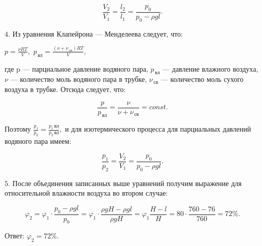 \documentclass[12pt,a4paper]{article}
\begin{document}
{\[\frac{V_2}{V_1} = \frac{l_2}{l_1} = \frac{p_0}{p_0 - \rho g l} .\]

$4$.  Из уравнения Клапейрона  — Менделеева следует, что: 

$p= \frac{\nu R T}{V} ,$ $p_{\,\text{вл}}= \frac{( \nu + \nu_{\,\text{св}} ) R T}{V} ,$

 где p  — парциальное давление водяного пара, $p_{\,\text{вл}}$  — давление влажного воздуха, $\nu$ — количество моль водяного пара в трубке, $\nu_{\,\text{св}}$  — количество моль сухого воздуха в трубке. Отсюда следует, что:

\[\frac{p}{p_{\,\text{вл}}} = \frac{\nu}{\nu + \nu_{\,\text{св}}} = const.\]

Поэтому $\frac{p_1}{p_2} = \frac{p_1 \,\text{вл}}{p_2 \,\text{вл}} ,$ и для изотермического процесса для парциальных давлений водяного пара имеем: 

\[\frac{p_1}{p_2} = \frac{V_2}{V_1} = \frac{p_0}{p_0 - \rho g l} .\]

$5$.  После объединения записанных выше уравнений получим выражение для относительной влажности воздуха во втором случае: 

\[\varphi_2=\varphi_1 \cdot \frac{p_0 - \rho g l}{p_0} =\varphi_1 \cdot \frac{\rho g H - \rho g l}{\rho g H} =\varphi_1 \frac{H - l}{H} =80 \cdot \frac{760 - 76}{760} =72 \%.\]

Ответ: $\varphi_2=72 \%.$
}
\end{document}
